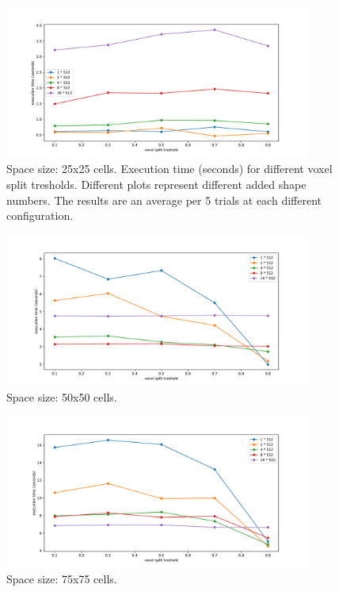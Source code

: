 \documentclass[12pt, oneside]{report}
\begin{document}
\begin{figure}[H]
  \centering
	\includegraphics[width=0.9\textwidth,keepaspectratio]{Images/SummaryOptimisation/results_25.pdf}
	\caption{Space size: 25x25 cells. Execution time (seconds) for different voxel split tresholds. Different plots represent different added shape numbers. The results are an average per 5 trials at each different configuration.}
	\label{summary_res25}
\end{figure}

\begin{figure}[H]
  \centering
	\includegraphics[width=0.9\textwidth,keepaspectratio]{Images/SummaryOptimisation/results_50.pdf}
	\caption{Space size: 50x50 cells.}
	\label{summary_res50}
\end{figure}

\begin{figure}[H]
  \centering
	\includegraphics[width=0.9\textwidth,keepaspectratio]{Images/SummaryOptimisation/results_75.pdf}
	\caption{Space size: 75x75 cells. }
	\label{summary_res75}
\end{figure}
\end{document}
